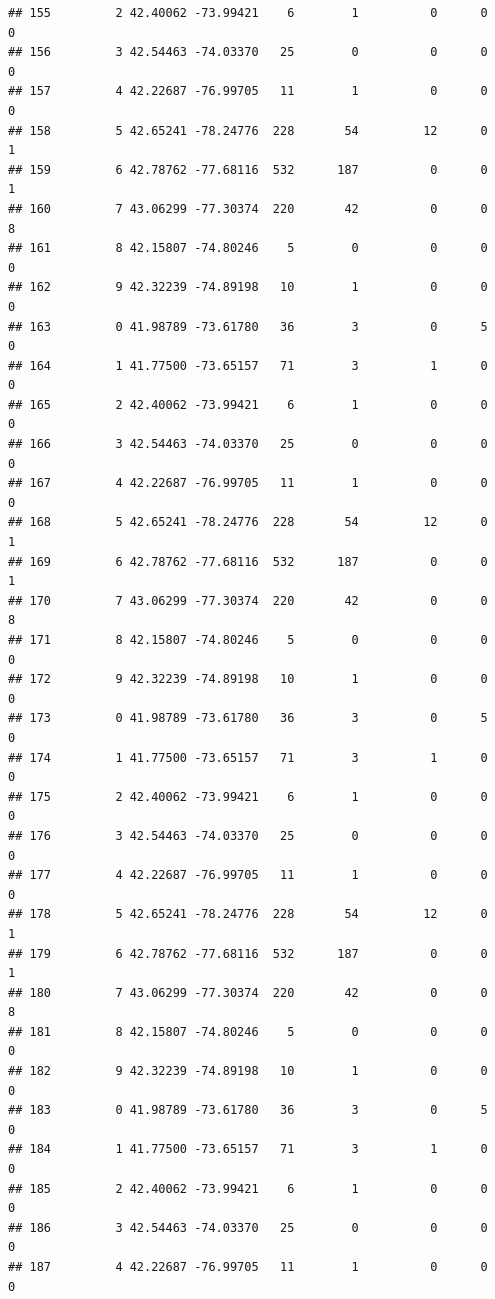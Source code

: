\documentclass[
]{article}
\begin{document}
\begin{verbatim}
## 155         2 42.40062 -73.99421    6        1          0      0            0
## 156         3 42.54463 -74.03370   25        0          0      0            0
## 157         4 42.22687 -76.99705   11        1          0      0            0
## 158         5 42.65241 -78.24776  228       54         12      0            1
## 159         6 42.78762 -77.68116  532      187          0      0            1
## 160         7 43.06299 -77.30374  220       42          0      0            8
## 161         8 42.15807 -74.80246    5        0          0      0            0
## 162         9 42.32239 -74.89198   10        1          0      0            0
## 163         0 41.98789 -73.61780   36        3          0      5            0
## 164         1 41.77500 -73.65157   71        3          1      0            0
## 165         2 42.40062 -73.99421    6        1          0      0            0
## 166         3 42.54463 -74.03370   25        0          0      0            0
## 167         4 42.22687 -76.99705   11        1          0      0            0
## 168         5 42.65241 -78.24776  228       54         12      0            1
## 169         6 42.78762 -77.68116  532      187          0      0            1
## 170         7 43.06299 -77.30374  220       42          0      0            8
## 171         8 42.15807 -74.80246    5        0          0      0            0
## 172         9 42.32239 -74.89198   10        1          0      0            0
## 173         0 41.98789 -73.61780   36        3          0      5            0
## 174         1 41.77500 -73.65157   71        3          1      0            0
## 175         2 42.40062 -73.99421    6        1          0      0            0
## 176         3 42.54463 -74.03370   25        0          0      0            0
## 177         4 42.22687 -76.99705   11        1          0      0            0
## 178         5 42.65241 -78.24776  228       54         12      0            1
## 179         6 42.78762 -77.68116  532      187          0      0            1
## 180         7 43.06299 -77.30374  220       42          0      0            8
## 181         8 42.15807 -74.80246    5        0          0      0            0
## 182         9 42.32239 -74.89198   10        1          0      0            0
## 183         0 41.98789 -73.61780   36        3          0      5            0
## 184         1 41.77500 -73.65157   71        3          1      0            0
## 185         2 42.40062 -73.99421    6        1          0      0            0
## 186         3 42.54463 -74.03370   25        0          0      0            0
## 187         4 42.22687 -76.99705   11        1          0      0            0

\end{verbatim}
\end{document}
